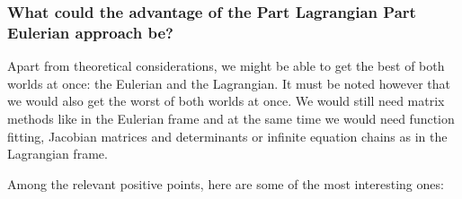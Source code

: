 \documentclass[11pt, a4paper]{article} %
\begin{document}




\newpage
\subsubsection*{What could the advantage of the Part Lagrangian Part Eulerian approach be?}
Apart from theoretical considerations, we might be able to get the best of both worlds at once: the Eulerian and the Lagrangian. It must be noted however that we would also get the worst of both worlds at once. We would still need matrix methods like in the Eulerian frame and at the same time we would need function fitting, Jacobian matrices and determinants or infinite equation chains as in the Lagrangian frame.

Among the relevant positive points, here are some of the most interesting ones:
\end{document}
